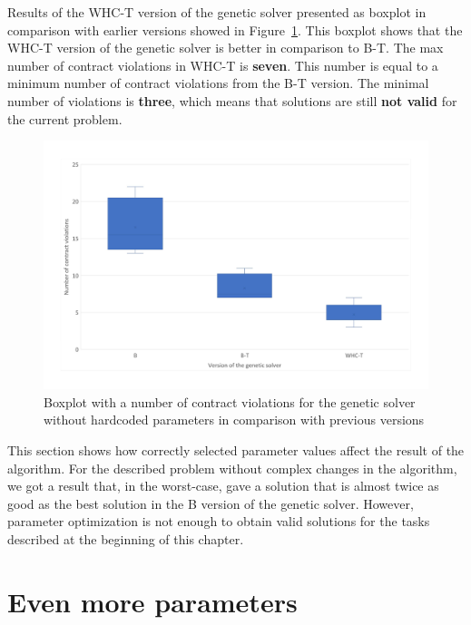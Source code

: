 Results of the WHC-T version of the genetic solver presented as boxplot in comparison with earlier versions showed in Figure~\ref{fig:boxplotsolverNoHardcodedTuning}. This boxplot shows that the WHC-T version of the genetic solver is better in comparison to B-T. The max number of contract violations in WHC-T is \textbf{seven}. This number is equal to a minimum number of contract violations from the B-T version. The minimal number of violations is \textbf{three}, which means that solutions are still \textbf{not valid} for the current problem. 

\begin{figure}
	\centering
	\includegraphics[width=\textwidth]{images/BoxPlotSolverNoHardcodedTuning.pdf}
	\caption[Boxplot with a number of contract violations for the genetic solver without hardcoded parameters in comparison with previous versions]{Boxplot with a number of contract violations for the genetic solver without hardcoded parameters in comparison with previous versions}
	\label{fig:boxplotsolverNoHardcodedTuning}
\end{figure}

This section shows how correctly selected parameter values affect the result of the algorithm. For the described problem without complex changes in the algorithm, we got a result that, in the worst-case, gave a solution that is almost twice as good as the best solution in the B version of the genetic solver. However, parameter optimization is not enough to obtain valid solutions for the tasks described at the beginning of this chapter. 

\section{Even more parameters}\label{sec:NP}

